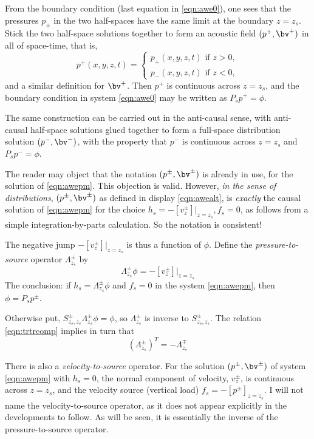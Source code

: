 From the boundary condition (last equation in \ref{eqn:awe0}), one
sees that the pressures $p_{\pm}$ in the two half-spaces have the same
limit at the boundary $z=z_s$. Stick the two half-space
solutions together to form an acoustic field $(p^+,\bv^+)$ in all of
space-time, that is,
\begin{equation}
  \label{eqn:awealt}
  p^+(x,y,z,t) =
  \left\{
    \begin{array}{c}
      p_+(x,y,z,t) \mbox{ if } z>0,\\
      p_-(x,y,z,t) \mbox{ if } z<0,
    \end{array}
  \right.
\end{equation}
and a similar definition for $\bv^+$. Then $p^+$ is continuous across
$z=z_s$, and the boundary condition in system \ref{eqn:awe0} may be
written as $P_sp^+=\phi$.

The same construction can be carried out in the anti-causal sense,
with anti-causal half-space solutions glued together to form a
full-space distribution solution $(p^-,\bv^-)$, with the property that
$p^-$ is continuous across $z=z_s$ and $P_sp^-=\phi$.

The reader may object that the notation $(p^\pm,\bv^\pm)$ is already in
use, for the solution of \ref{eqn:awepm}. This objection is
valid. However, {\em in the sense
  of distributions}, $(p^{\pm},\bv^{\pm})$ as defined in display
\ref{eqn:awealt}, is {\em exactly} the causal solution of \ref{eqn:awepm}
for the choice $h_s = -[v^{\pm}_{z}]|_{z=z_s}, f_s=0$, as follows from a
simple integration-by-parts calculation. So the notation is consistent!

The negative jump $-[v^{\pm}_{z}]|_{z=z_s}$ is thus a function of $\phi$. Define
the {\em pressure-to-source} operator $\Lambda^{\pm}_{z_s}$ by
\begin{equation}
  \label{eqn:deflam}
  \Lambda^{\pm}_{z_s}\phi = -[v^{\pm}_{z}]|_{z=z_s}
\end{equation}
The conclusion: if $h_s = \Lambda^{\pm}_{z_s}\phi$ and $f_s=0$ in the
system \ref{eqn:awepm}, then $\phi=P_sp^{\pm}$.

Otherwise put, $S^{\pm}_{z_s,z_s}\Lambda^{\pm}_{z_s} \phi = \phi$, so
$\Lambda^{\pm}_{z_s}$ is inverse to $S^{\pm}_{z_s,z_s}$. The relation
\ref{eqn:trtrcomp} implies in turn that
\begin{equation}
  \label{eqn:lamadj}
  (\Lambda^{\pm}_{z_s})^T = - \Lambda^{\mp}_{z_s}
\end{equation}

There is also a {\em velocity-to-source} operator. For the solution
$(p^{\pm},\bv^{\pm})$ of system \ref{eqn:awepm} with $h_s=0$, the
normal component of velocity, $v^{\pm}_z$, is continuous across
$z=z_s$, and the velocity source (vertical load)
$f_s=-[p^{\pm}]_{z=z_s}$. I will not name the velocity-to-source
operator, as it does not appear explicitly in the developments to
follow. As will be seen, it is essentially the inverse of the
pressure-to-source operator.

